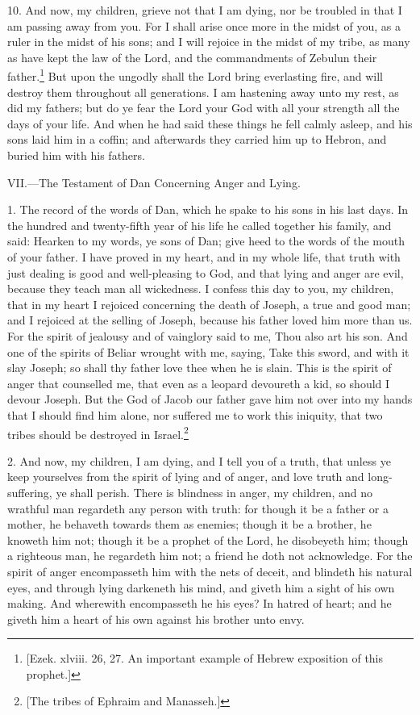 10. And now, my children, grieve not that I am dying, nor be troubled in that I am passing away from you. For I shall arise once more in the midst of you, as a ruler in the midst of his sons; and I will rejoice in the midst of my tribe, as many as have kept the law of the Lord, and the commandments of Zebulun their father.\footnote{[Ezek. xlviii. 26, 27. An important example of Hebrew exposition of this prophet.]} But upon the ungodly shall the Lord bring everlasting fire, and will destroy them throughout all generations. I am hastening away unto my rest, as did my fathers; but do ye fear the Lord your God with all your strength all the days of your life. And when he had said these things he fell calmly asleep, and his sons laid him in a coffin; and afterwards they carried him up to Hebron, and buried him with his fathers.


VII.—The Testament of Dan Concerning Anger and Lying.

1. The record of the words of Dan, which he spake to his sons in his last days. In the hundred and twenty-fifth year of his life he called together his family, and said: Hearken to my words, ye sons of Dan; give heed to the words of the mouth of your father. I have proved in my heart, and in my whole life, that truth with just dealing is good and well-pleasing to God, and that lying and anger are evil, because they teach man all wickedness. I confess this day to you, my children, that in my heart I rejoiced concerning the death of Joseph, a true and good man; and I rejoiced at the selling of Joseph, because his father loved him more than us. For the spirit of jealousy and of vainglory said to me, Thou also art his son. And one of the spirits of Beliar wrought with me, saying, Take this sword, and with it slay Joseph; so shall thy father love thee when he is slain. This is the spirit of anger that counselled me, that even as a leopard devoureth a kid, so should I devour Joseph. But the God of Jacob our father gave him not over into my hands that I should find him alone, nor suffered me to work this iniquity, that two tribes should be destroyed in Israel.\footnote{[The tribes of Ephraim and Manasseh.]}

2. And now, my children, I am dying, and I tell you of a truth, that unless ye keep yourselves from the spirit of lying and of anger, and love truth and long-suffering, ye shall perish. There is blindness in anger, my children, and no wrathful man regardeth any person with truth: for though it be a father or a mother, he behaveth towards them as enemies; though it be a brother, he knoweth him not; though it be a prophet of the Lord, he disobeyeth him; though a righteous man, he regardeth him not; a friend he doth not acknowledge. For the spirit of anger encompasseth him with the nets of deceit, and blindeth his natural eyes, and through lying darkeneth his mind, and giveth him a sight of his own making. And wherewith encompasseth he his eyes? In hatred of heart; and he giveth him a heart of his own against his brother unto envy.

